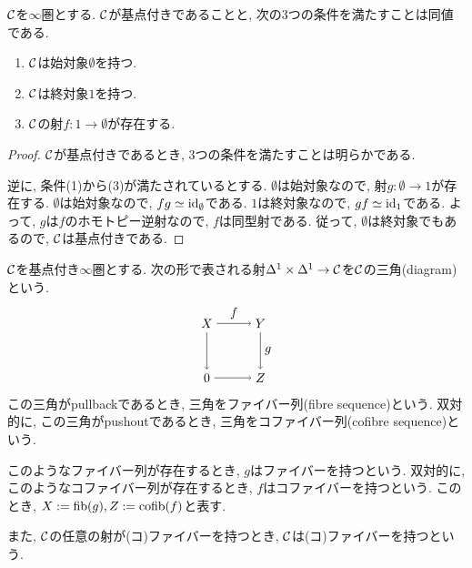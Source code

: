 \documentclass[uplatex, a4paper, 14Q, dvipdfmx]{jsarticle}
\begin{document}
\begin{lemma}
  $\mathcal{C}$を$\infty$圏とする.
  $\mathcal{C}$が基点付きであることと, 次の3つの条件を満たすことは同値である. 
  \begin{enumerate}
    \item $\mathcal{C}$は始対象$\emptyset$を持つ.
    \item $\mathcal{C}$は終対象$1$を持つ. 
    \item $\mathcal{C}$の射$f : 1 \to \emptyset$が存在する. 
  \end{enumerate}
\end{lemma}

\begin{proof}
  $\mathcal{C}$が基点付きであるとき, 3つの条件を満たすことは明らかである. 

  逆に, 条件(1)から(3)が満たされているとする.
  $\emptyset$は始対象なので, 射$g : \emptyset \to 1$が存在する.
  $\emptyset$は始対象なので, $fg \simeq \mathrm{id}_\emptyset$である.
  $1$は終対象なので, $gf \simeq \mathrm{id}_1$である. 
  よって, $g$は$f$のホモトピー逆射なので, $f$は同型射である.
  従って, $\emptyset$は終対象でもあるので, $\mathcal{C}$は基点付きである. 
\end{proof}

\begin{definition}[(コ)ファイバー]
  $\mathcal{C}$を基点付き$\infty$圏とする.
  次の形で表される射$\Delta^1 \times \Delta^1 \to \mathcal{C}$を$\mathcal{C}$の三角(diagram)という. 
  \[
    \begin{tikzpicture}[auto,->]
      \node (0) at (0,0) {$0$};
      \node (Z) at (1.5,0) {$Z$};
      \node (X) at (0,1.5) {$X$};
      \node (Y) at (1.5,1.5) {$Y$};
      \draw (0) -- (Z);
      \draw (X) -- (0);
      \draw (X) -- node{$f$} (Y);
      \draw (Y) -- node{$g$} (Z);
    \end{tikzpicture}
  \]
  この三角がpullbackであるとき, 三角をファイバー列(fibre sequence)という.
  双対的に, この三角がpushoutであるとき, 三角をコファイバー列(cofibre sequence)という.

  このようなファイバー列が存在するとき, $g$はファイバーを持つという. 
  双対的に, このようなコファイバー列が存在するとき, $f$はコファイバーを持つという. 
  このとき, $X:=\mathrm{fib}(g), Z := \mathrm{cofib}(f)$と表す. 

  また, $\mathcal{C}$の任意の射が(コ)ファイバーを持つとき, $\mathcal{C}$は(コ)ファイバーを持つという. 
\end{definition}
\end{document}

